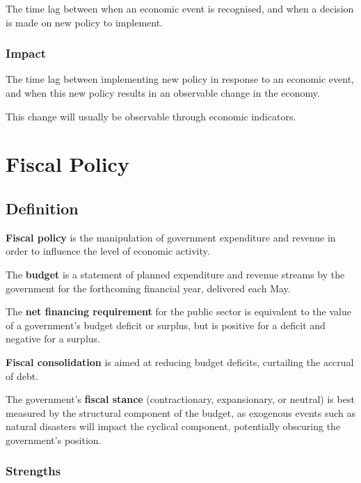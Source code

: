 \documentclass[a4paper,11pt]{report}
\begin{document}
The time lag between when an economic event is recognised, and when a decision
is made on new policy to implement.

\subsection{Impact}

The time lag between implementing new policy in response to an economic event,
and when this new policy results in an observable change in the economy.

This change will usually be observable through economic indicators.




\chapter{Fiscal Policy}

\section{Definition}

\textbf{Fiscal policy} is the manipulation of government expenditure and
revenue in order to influence the level of economic activity.

The \textbf{budget} is a statement of planned expenditure and revenue streams
by the government for the forthcoming financial year, delivered each May.

The \textbf{net financing requirement} for the public sector is equivalent to
the value of a government's budget deficit or surplus, but is positive for a
deficit and negative for a surplus.

\textbf{Fiscal consolidation} is aimed at reducing budget deficits, curtailing
the accrual of debt.

The government's \textbf{fiscal stance} (contractionary, expansionary, or
neutral) is best measured by the structural component of the budget, as
exogenous events such as natural disasters will impact the cyclical component,
potentially obscuring the government's position.

\subsection{Strengths}
\end{document}

